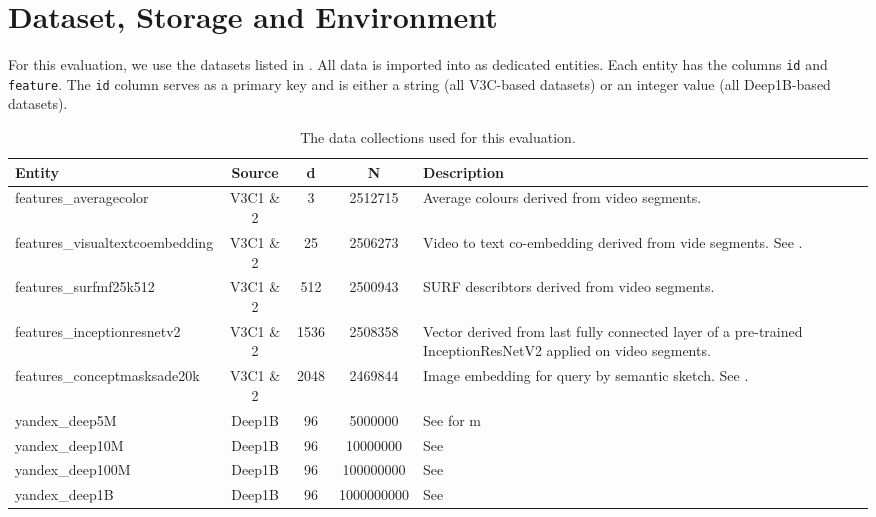 \section{Dataset, Storage and Environment}

For this evaluation, we use the datasets listed in . All data is imported into \cottontail{} as dedicated entities. Each entity has the columns \texttt{id} and \texttt{feature}. The \texttt{id}  column serves as a primary key and is either a string (all V3C-based datasets) or an integer value (all Deep1B-based datasets).

\begin{table}
    \begin{tabular}{ | l | c | c | c | p{5cm} |}
        \hline
        \textbf{Entity} & \textbf{Source} & \textbf{d} & \textbf{N} & \textbf{Description} \\
        \hline
        \hline
        features\_averagecolor & V3C1 \& 2  & 3 & 2512715 & Average colours derived from video segments. \\ 
        \hline
        features\_visualtextcoembedding & V3C1 \& 2 & 25 & 2506273 & Video to text co-embedding derived from vide segments. See \cite{Spiess:2021Competitive}. \\
        \hline
        features\_surfmf25k512  & V3C1 \& 2  & 512 & 2500943 & SURF \cite{Bay:2006surf} describtors derived from video segments. \\
        \hline
        features\_inceptionresnetv2 & V3C1 \& 2  & 1536 & 2508358 & Vector derived from last fully connected layer of a pre-trained InceptionResNetV2 applied on video segments.\\
        \hline
        features\_conceptmasksade20k & V3C1 \& 2 & 2048 & 2469844 & Image embedding for query by semantic sketch. See \cite{Rossetto:2019Query}. \\
        \hline
        yandex\_deep5M  & Deep1B  & 96 & 5000000 & See \cite{Babenko:2016Efficient} for m\\
        \hline
        yandex\_deep10M  & Deep1B & 96 & 10000000 & See \cite{Babenko:2016Efficient} \\
        \hline
        yandex\_deep100M  & Deep1B & 96 & 100000000 & See \cite{Babenko:2016Efficient} \\
        \hline
        yandex\_deep1B  & Deep1B & 96 & 1000000000 & See \cite{Babenko:2016Efficient} \\
        \hline
        \hline
    \end{tabular}
    \caption{The data collections used for this evaluation.}
    \label{table:datasets}
\end{table}

